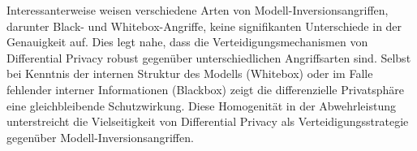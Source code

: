 Interessanterweise weisen verschiedene Arten von Modell-Inversionsangriffen, darunter Black- und Whitebox-Angriffe, keine signifikanten Unterschiede in der Genauigkeit auf. Dies legt nahe, dass die Verteidigungsmechanismen von Differential Privacy robust gegenüber unterschiedlichen Angriffsarten sind. Selbst bei Kenntnis der internen Struktur des Modells (Whitebox) oder im Falle fehlender interner Informationen (Blackbox) zeigt die differenzielle Privatsphäre eine gleichbleibende Schutzwirkung. Diese Homogenität in der Abwehrleistung unterstreicht die Vielseitigkeit von Differential Privacy als Verteidigungsstrategie gegenüber Modell-Inversionsangriffen.


